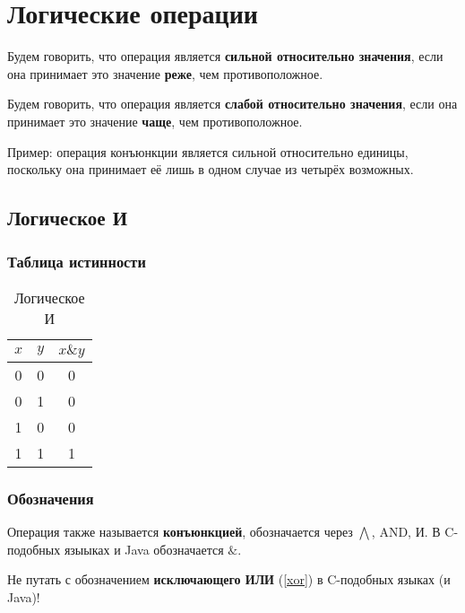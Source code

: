 \section{Логические операции}

\begin{definition}
	Будем говорить, что операция является \textbf{сильной относительно значения}, если она принимает это значение \textbf{реже}, чем противоположное.
\end{definition}

\begin{definition}
	Будем говорить, что операция является \textbf{слабой относительно значения}, если она принимает это значение \textbf{чаще}, чем противоположное.
\end{definition}
Пример: операция конъюнкции является сильной относительно единицы, поскольку она принимает её лишь в одном случае из четырёх возможных.

\subsection{Логическое И}
\subsubsection{Таблица истинности}
\begin{table}[H]
	\begin{center}
		\begin{tabular}{|c|c|c|}
			\hline
			$x$ & $y$ & $x\&y$\\
			\hline
			0 & 0 & 0\\
			\hline
			0 & 1 & 0\\
			\hline
			1 & 0 & 0\\
			\hline
			1 & 1 & 1\\
			\hline
		\end{tabular}
		\caption{Логическое И}
	\end{center}
\end{table}

\subsubsection{Обозначения}
Операция также называется \textbf{конъюнкцией}, обозначается через $\bigwedge$, AND, И. В C-подобных языыках и Java обозначается $\&$.
\begin{remark}
	Не путать с обозначением \textbf{исключающего ИЛИ} (\ref{xor}) в C-подобных языках (и Java)!
\end{remark}


